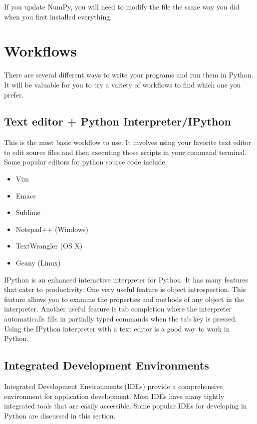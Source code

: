 \begin{info}
If you update NumPy, you will need to modify the file  the same way you did when you first installed everything.
\end{info}

\section*{Workflows}
There are several different ways to write your programs and run them in Python. It will be valuable for you to try a variety of workflows to find which one you prefer.

\subsection*{Text editor + Python Interpreter/IPython}
This is the most basic workflow to use.
It involves using your favorite text editor to edit source files and then executing
those scripts in your command terminal.
Some popular editors for python source code include:
\begin{itemize}
\item Vim
\item Emacs
\item Sublime
\item Notepad++ (Windows)
\item TextWrangler (OS X)
\item Geany (Linux)
\end{itemize}

IPython is an enhanced interactive interpreter for Python.
It has many features that cater to productivity.
One very useful feature is object introspection.
This feature allows you to examine the properties and methods of any object in the
interpreter.
Another useful feature is tab completion where the interpreter automaticalls fills in partially typed commands when the tab key is pressed.
Using the IPython interpreter with a text editor is a good way to work in Python.

\subsection*{Integrated Development Environments}
Integrated Development Environments (IDEs) provide a comprehensive environment for
application development.
Most IDEs have many tightly integrated tools that are easily accessible.
Some popular IDEs for developing in Python are discussed in this section.

